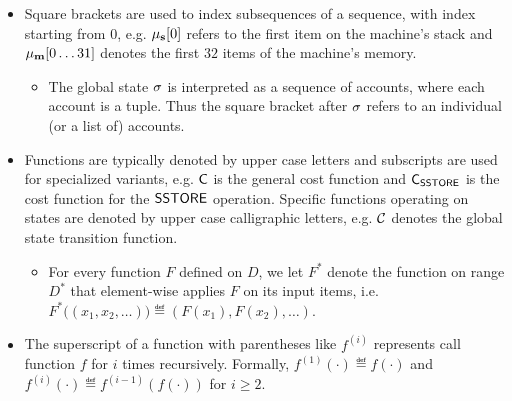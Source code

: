 \begin{itemize}[nosep]

	\item Square brackets are used to index subsequences of a sequence, with index starting from $0$, e.g. $\mathbf{\mu}_{\mathbf{s}}[0]$ refers to the first item on the machine's stack and $\mathbf{\mu}_{\mathbf{m}}[0\dots 31]$ denotes the first $32$ items of the machine's memory.
	\begin{itemize}[nosep]
		\item The global state $\mathbf{\sigma}$ is interpreted as a sequence of accounts, where each account is a tuple.
		Thus the square bracket after $\mathbf{\sigma}$ refers to an individual (or a list of) accounts.
	\end{itemize}


	\item Functions are typically denoted by upper case letters and subscripts are used for specialized variants, e.g. $\mathsf{C}$ is the general cost function and $\mathsf{C}_{\mathsf{SSTORE}}$ is the cost function for the $\mathsf{SSTORE}$ operation.
	Specific functions operating on states are denoted by upper case calligraphic letters, e.g. $\mathcal{C}$ denotes the {\name} global state transition function.
	\begin{itemize}[nosep]
		\item For every function $F$ defined on $D$, we let $F^*$ denote the function on range $D^*$ that element-wise applies $F$ on its input items, i.e. $F^*\big( \left(x_1, x_2, \dots\right) \big) \eqdef \left( F(x_1), F(x_2),\dots \right)$. 
	\end{itemize}

	\item The superscript of a function with parentheses like $f^{(i)}$ represents call function $f$ for $i$ times recursively. Formally, $f^{(1)}(\cdot)\eqdef f(\cdot)$ and $f^{(i)}(\cdot)\eqdef f^{(i-1)}(f(\cdot))$ for $i\ge 2$.


\end{itemize}  

\smallskip

